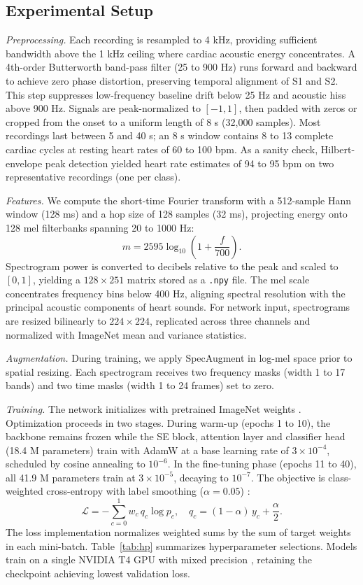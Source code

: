 \documentclass[conference]{IEEEtran}
\begin{document}
\subsection{Experimental Setup}
\textit{Preprocessing.} Each recording is resampled to 4 kHz, providing sufficient bandwidth above the 1 kHz ceiling where cardiac acoustic energy concentrates. A 4th-order Butterworth band-pass filter (25 to 900 Hz) runs forward and backward to achieve zero phase distortion, preserving temporal alignment of S1 and S2. This step suppresses low-frequency baseline drift below 25 Hz and acoustic hiss above 900 Hz. Signals are peak-normalized to $[-1,1]$, then padded with zeros or cropped from the onset to a uniform length of 8 s (32,000 samples). Most recordings last between 5 and 40 s; an 8 s window contains 8 to 13 complete cardiac cycles at resting heart rates of 60 to 100 bpm. As a sanity check, Hilbert-envelope peak detection yielded heart rate estimates of 94 to 95 bpm on two representative recordings (one per class).

\textit{Features.} We compute the short-time Fourier transform with a 512-sample Hann window (128 ms) and a hop size of 128 samples (32 ms), projecting energy onto 128 mel filterbanks spanning 20 to 1000 Hz:
\begin{equation}
m = 2595\log_{10}\!\left(1+\frac{f}{700}\right).
\end{equation}
Spectrogram power is converted to decibels relative to the peak and scaled to $[0,1]$, yielding a $128\times251$ matrix stored as a \texttt{.npy} file. The mel scale concentrates frequency bins below 400 Hz, aligning spectral resolution with the principal acoustic components of heart sounds. For network input, spectrograms are resized bilinearly to $224\times224$, replicated across three channels and normalized with ImageNet mean and variance statistics.

\textit{Augmentation.} During training, we apply SpecAugment \cite{park} in log-mel space prior to spatial resizing. Each spectrogram receives two frequency masks (width 1 to 17 bands) and two time masks (width 1 to 24 frames) set to zero.

\textit{Training.} The network initializes with pretrained ImageNet weights \cite{deng}. Optimization proceeds in two stages. During warm-up (epochs 1 to 10), the backbone remains frozen while the SE block, attention layer and classifier head (18.4 M parameters) train with AdamW \cite{adamw} at a base learning rate of $3\times10^{-4}$, scheduled by cosine annealing \cite{sgdr} to $10^{-6}$. In the fine-tuning phase (epochs 11 to 40), all 41.9 M parameters train at $3\times10^{-5}$, decaying to $10^{-7}$. The objective is class-weighted cross-entropy with label smoothing ($\alpha=0.05$) \cite{szegedy}:
\begin{equation}
\mathcal{L} = -\sum_{c=0}^{1} w_c\, q_c \log p_c,\quad q_c = (1-\alpha)\,y_c + \frac{\alpha}{2}.
\end{equation}
The loss implementation normalizes weighted sums by the sum of target weights in each mini-batch. Table~\ref{tab:hp} summarizes hyperparameter selections. Models train on a single NVIDIA T4 GPU with mixed precision \cite{micikevicius}, retaining the checkpoint achieving lowest validation loss.
\end{document}
